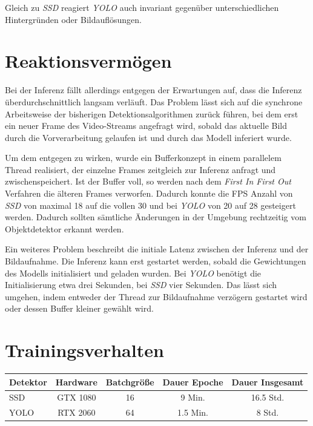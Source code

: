 Gleich zu \textit{SSD} reagiert \textit{YOLO} auch invariant gegenüber unterschiedlichen Hintergründen oder Bildauflösungen.
 
\section{Reaktionsvermögen}

Bei der Inferenz fällt allerdings entgegen der Erwartungen auf, dass die Inferenz überdurchschnittlich langsam verläuft. Das Problem lässt sich auf die synchrone Arbeitsweise der bisherigen Detektionsalgorithmen zurück führen, bei dem erst ein neuer Frame des Video-Streams angefragt wird, sobald das aktuelle Bild durch die Vorverarbeitung gelaufen ist und durch das Modell inferiert wurde. 

Um dem entgegen zu wirken, wurde ein Bufferkonzept in einem parallelem Thread realisiert, der einzelne Frames zeitgleich zur Inferenz anfragt und zwischenspeichert. Ist der Buffer voll, so werden nach dem \textit{First In First Out} Verfahren die älteren Frames verworfen. Dadurch konnte die FPS Anzahl von \textit{SSD} von maximal 18 auf die vollen 30 und bei \textit{YOLO} von 20 auf 28 gesteigert werden. Dadurch sollten sämtliche Änderungen in der Umgebung rechtzeitig vom Objektdetektor erkannt werden. 

Ein weiteres Problem beschreibt die initiale Latenz zwischen der Inferenz und der Bildaufnahme. Die Inferenz kann erst gestartet werden, sobald die Gewichtungen des Modells initialisiert und geladen wurden. Bei \textit{YOLO} benötigt die Initialisierung etwa drei Sekunden, bei \textit{SSD} vier Sekunden. Das lässt sich umgehen, indem entweder der Thread zur Bildaufnahme verzögern gestartet wird oder dessen Buffer kleiner gewählt wird.

\section{Trainingsverhalten}

\begin{center}
	\begin{tabular}[H]{l|c|c|c|c}
		Detektor & Hardware & Batchgröße & Dauer Epoche & Dauer Insgesamt \\
		\hline
		SSD & GTX 1080 & 16 & 9 Min. & 16.5 Std. \\
		YOLO & RTX 2060 & 64 & 1.5 Min. & 8 Std.
	\end{tabular}
	\label{table:duration}
\end{center}

